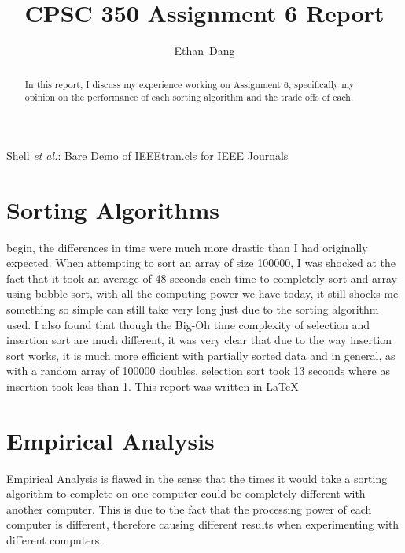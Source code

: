 \documentclass[journal]{IEEEtran}
\begin{document}
\title{CPSC 350 Assignment 6 Report}

\author{Ethan~Dang}

{Shell \MakeLowercase{\textit{et al.}}: Bare Demo of IEEEtran.cls for IEEE Journals}

\maketitle

\begin{abstract}
In this report, I discuss my experience working on Assignment 6, specifically my opinion on the performance of each sorting algorithm and the trade offs of each. 
\end{abstract}

\IEEEpeerreviewmaketitle

\section{Sorting Algorithms}
 begin, the differences in time were much more drastic than I had originally expected. When attempting to sort an array of size 100000, I was shocked at the fact that it took an average of 48 seconds each time to completely sort and array using bubble sort, with all the computing power we have today, it still shocks me something so simple can still take very long just due to the sorting algorithm used. I also found that though the Big-Oh time complexity of selection and insertion sort are much different, it was very clear that due to the way insertion sort works, it is much more efficient with partially sorted data and in general, as with a random array of 100000 doubles, selection sort took 13 seconds where as insertion took less than 1. This report was written in \LaTeX\ 


\section{Empirical Analysis}
Empirical Analysis is flawed in the sense that the times it would take a sorting algorithm to complete on one computer could be completely different with another computer. This is due to the fact that the processing power of each computer is different, therefore causing different results when experimenting with different computers.
\end{document}
